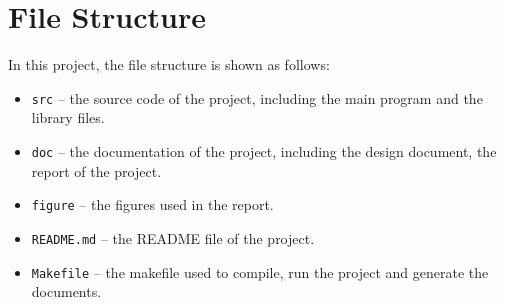 \section{File Structure}

In this project, the file structure is shown as follows:
\begin{itemize}
  \item \verb|src| -- the source code of the project, including the main program and the library files.
  \item \verb|doc| -- the documentation of the project, including the design document, the report of the project.
  \item \verb|figure| -- the figures used in the report.
  \item \verb|README.md| -- the README file of the project.
  \item \verb|Makefile| -- the makefile used to compile, run the project and generate the documents.
\end{itemize}



